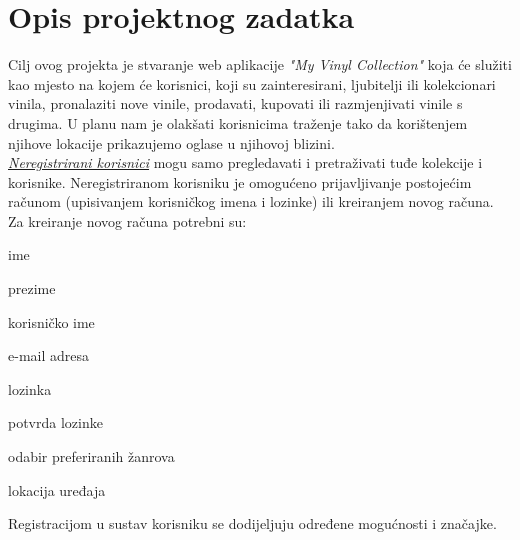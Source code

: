 \chapter{Opis projektnog zadatka}
		
%		
%		
	
		\text Cilj ovog projekta je stvaranje web aplikacije \textit{"My Vinyl Collection"} koja će služiti kao mjesto na kojem će korisnici, koji su zainteresirani, ljubitelji ili kolekcionari vinila, pronalaziti nove vinile, prodavati, kupovati ili razmjenjivati vinile s drugima. U planu nam je olakšati korisnicima traženje tako da korištenjem njihove lokacije prikazujemo oglase u njihovoj blizini.\\
		
		\textit{\underline{Neregistrirani korisnici}} mogu samo pregledavati i pretraživati tuđe kolekcije i korisnike. Neregistriranom korisniku je omogućeno prijavljivanje postojećim računom (upisivanjem korisničkog imena i lozinke) ili kreiranjem novog računa. Za kreiranje novog računa potrebni su: 
		\begin{packed_item}
			\item ime
			\item prezime
			\item korisničko ime
			\item e-mail adresa
			\item lozinka
			\item potvrda lozinke
			\item odabir preferiranih žanrova
			\item lokacija uređaja
		\end{packed_item}
Registracijom u sustav korisniku se dodijeljuju određene mogućnosti i značajke.\\

